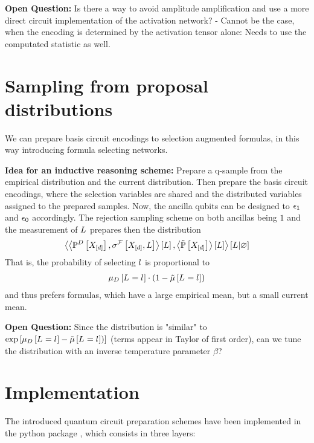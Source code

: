 \documentclass[aps,onecolumn,nofootinbib,pra]{article}
\begin{document}
    \textbf{Open Question:} Is there a way to avoid amplitude amplification and use a more direct circuit implementation of the activation network?
    - Cannot be the case, when the encoding is determined by the activation tensor alone: Needs to use the computated statistic as well.


    \section{Sampling from proposal distributions}

    We can prepare basis circuit encodings to selection augmented formulas, in this way introducing formula selecting networks.

    \textbf{Idea for an inductive reasoning scheme:} Prepare a q-sample from the empirical distribution and the current distribution.
    Then prepare the basis circuit encodings, where the selection variables are shared and the distributed variables assigned to the prepared samples.
    Now, the ancilla qubits can be designed to $\epsilon_{1}$ and $\epsilon_{0}$ accordingly.
    The rejection sampling scheme on both ancillas being $1$ and the measurement of $L$ prepares then the distribution
    \begin{align*}
        \left\langle 
            \left\langle \mathbb{P}^{D}\left[X_{[d]}\right], \sigma^{\mathcal{F}}\left[X_{[d]},L\right]\right\rangle \left[ L \right], \left\langle \tilde{\mathbb{P}}\left[X_{[d]}\right]\right\rangle \left[ L \right]
        \right\rangle \left[ L | \varnothing \right]
    \end{align*}
    That is, the probability of selecting $l$ is proportional to
    \begin{align*}
        \mu_{D}\left[L_{}=l_{}\right] \cdot (1-\tilde{\mu}\left[L_{}=l_{}\right])
    \end{align*}
    and thus prefers formulas, which have a large empirical mean, but a small current mean.

    \textbf{Open Question:} Since the distribution is "similar" to $\mathrm{exp}\left[\mu_{D}\left[L_{}=l_{}\right]-\tilde{\mu}\left[L_{}=l_{}\right])\right]$ (terms appear in Taylor of first order), can we tune the distribution with an inverse temperature parameter $\beta$?


    \section{Implementation}

    The introduced quantum circuit preparation schemes have been implemented in the python package \qcreason{}, which consists in three layers:
    \begin{center}
        
    \end{center}
\end{document}
